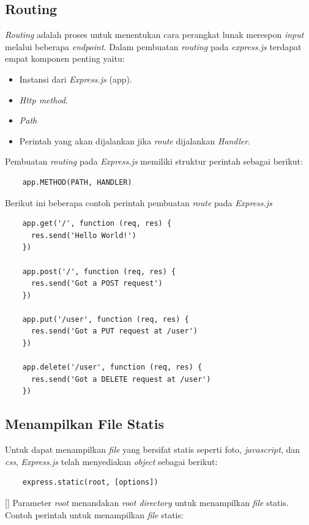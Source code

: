 \subsection{Routing}
\textit{Routing} adalah proses untuk menentukan cara perangkat lunak merespon \textit{input} melalui beberapa \textit{endpoint}. Dalam pembuatan \textit{routing} pada \textit{express.js} terdapat empat komponen penting yaitu:
\begin{itemize}
    \item Instansi dari \textit{Express.js} (app).
    \item \textit{Http method}.
    \item \textit{Path}
    \item Perintah yang akan dijalankan jika \textit{route} dijalankan \textit{Handler}.
\end{itemize}
Pembuatan \textit{routing} pada \textit{Express.js} memiliki struktur perintah sebagai berikut:
\begin{verbatim}
    app.METHOD(PATH, HANDLER)
\end{verbatim}
Berikut ini beberapa contoh perintah pembuatan \textit{route} pada \textit{Express.js}
\begin{lstlisting}
    app.get('/', function (req, res) {
      res.send('Hello World!')
    })
    
    app.post('/', function (req, res) {
      res.send('Got a POST request')
    })
    
    app.put('/user', function (req, res) {
      res.send('Got a PUT request at /user')
    })
    
    app.delete('/user', function (req, res) {
      res.send('Got a DELETE request at /user')
    })
\end{lstlisting}

\subsection{Menampilkan File Statis}
Untuk dapat menampilkan \textit{file} yang bersifat statis seperti foto, \textit{javascript}, dan \textit{css}, \textit{Express.js} telah menyediakan \textit{object} sebagai berikut:
\begin{verbatim}
    express.static(root, [options])
\end{verbatim}[] 
Parameter \textit{root} menandakan \textit{root directory} untuk menampilkan \textit{file} statis. Contoh perintah untuk menampilkan \textit{file} statis:

